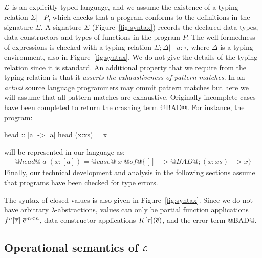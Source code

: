 $\cal L$ is an explicitly-typed language, and we assume the 
existence of a typing relation $\Sigma |- P$, which checks 
that a program conforms to the definitions in the signature $\Sigma$. A signature $\Sigma$ (Figure~\ref{fig:syntax})
records the declared data types, data constructors and types of functions in the program $P$. The 
well-formedness of expressions is checked with a typing relation $\Sigma;\Delta |- u : \tau$, where $\Delta$
is a typing environment, also in Figure~\ref{fig:syntax}.
We do not give the details of the typing relation since it is standard. An additional property that we require 
from the typing relation is that it {\em asserts the exhaustiveness of pattern matches}. In an {\em actual}
source language programmers may ommit pattern matches but here we will assume that all pattern matches 
are exhaustive. Originally-incomplete cases have been completed to return the crashing term @BAD@. For 
instance, the program:
\begin{code}
head :: [a] -> [a]
head (x:xs) = x
\end{code}
will be represented in our language as:
\[\begin{array}{l}
   @head@\; a\; (x{:}[a]) = @case@\;x\;@of@ \{ [] -> @BAD@ ; (x:xs) -> x \} 
\end{array}\]
Finally, our technical development and analysis in the following sections assume that programs have been 
checked for type errors. 

The syntax of closed values is also given in Figure~\ref{fig:syntax}. Since we do not 
have arbitrary $\lambda$-abstractions, values can only be partial function applications
$f^n[\overline{\tau}]\;\overline{e}^{m < n}$, data constructor applications $K[\tau](\overline{e})$, 
and the error term @BAD@. 

\subsection{Operational semantics of $\cal L$}

